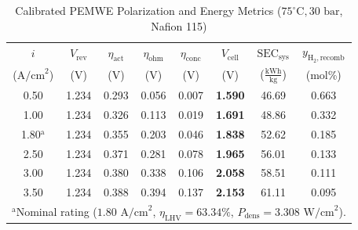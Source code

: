 \documentclass[conference]{IEEEtran}
\begin{document}
\begin{table}[t]
\caption{Calibrated PEMWE Polarization and Energy Metrics ($75^\circ\text{C}, 30\text{ bar}$, Nafion 115)}
\begin{center}
\begin{tabular}{cccccccc}
\toprule
$i$ & $V_{\text{rev}}$ & $\eta_{\text{act}}$ & $\eta_{\text{ohm}}$ & $\eta_{\text{conc}}$ & $V_{\text{cell}}$ & $\text{SEC}_{\text{sys}}$ & $y_{\text{H}_2,\text{recomb}}$ \\
($\text{A/cm}^2$) & (V) & (V) & (V) & (V) & (V) & ($\frac{\text{kWh}}{\text{kg}}$) & (mol\%) \\
\midrule
0.50 & 1.234 & 0.293 & 0.056 & 0.007 & \textbf{1.590} & 46.69 & 0.663 \\
1.00 & 1.234 & 0.326 & 0.113 & 0.019 & \textbf{1.691} & 48.86 & 0.332 \\
1.80$^{\text{a}}$ & 1.234 & 0.355 & 0.203 & 0.046 & \textbf{1.838} & 52.62 & 0.185 \\
2.50 & 1.234 & 0.371 & 0.281 & 0.078 & \textbf{1.965} & 56.01 & 0.133 \\
3.00 & 1.234 & 0.380 & 0.338 & 0.106 & \textbf{2.058} & 58.51 & 0.111 \\
3.50 & 1.234 & 0.388 & 0.394 & 0.137 & \textbf{2.153} & 61.11 & 0.095 \\
\bottomrule
\multicolumn{8}{l}{\footnotesize $^{\text{a}}$Nominal rating ($1.80\text{ A/cm}^2$, $\eta_{\text{LHV}} = 63.34\%$, $P_{\text{dens}} = 3.308\text{ W/cm}^2$).}
\end{tabular}
\label{tab:pem_perf}
\end{center}
\end{table}
\end{document}
